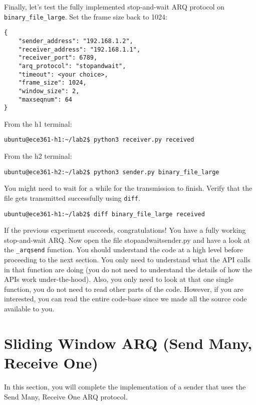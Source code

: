 \documentclass[11pt]{article}
\begin{document}
Finally, let's test the fully implemented stop-and-wait ARQ protocol on \texttt{binary\_file\_large}. Set the frame size back to 1024:
\begin{lstlisting}[style=ece361-shell-base, caption={Configuration For Large File}]
{
    "sender_address": "192.168.1.2",
    "receiver_address": "192.168.1.1",
    "receiver_port": 6789,
    "arq_protocol": "stopandwait",
    "timeout": <your choice>,
    "frame_size": 1024,
    "window_size": 2,
    "maxseqnum": 64
}
\end{lstlisting}

From the h1 terminal:
\begin{lstlisting}[style=ece361-shell-base, caption={}]
ubuntu@ece361-h1:~/lab2$ python3 receiver.py received
\end{lstlisting}

From the h2 terminal:
\begin{lstlisting}[style=ece361-shell-base, caption={}]
ubuntu@ece361-h2:~/lab2$ python3 sender.py binary_file_large
\end{lstlisting}

\noindent You might need to wait for a while for the transmission to finish. Verify that the file gets transmitted successfully using \texttt{diff}.
\begin{lstlisting}[style=ece361-shell-base, caption={}]
ubuntu@ece361-h1:~/lab2$ diff binary_file_large received
\end{lstlisting}

If the previous experiment succeeds, congratulations! You have a fully working stop-and-wait ARQ.
Now open the file stopandwaitsender.py and have a look at the \texttt{\_arqsend} function.
You should understand the code at a high level before proceeding to the next section. You only need to understand what the API calls in that function are doing (you do not need to understand the details of how the APIs work under-the-hood).
Also, you only need to look at that one single function, you do not need to read other parts of the code.
However, if you are interested, you can read the entire code-base since we made all the source code available to you.

\section{Sliding Window ARQ (Send Many, Receive One)}
\label{sec:sliding}
In this section, you will complete the implementation of a sender that uses the Send Many, Receive One ARQ protocol.
\end{document}
